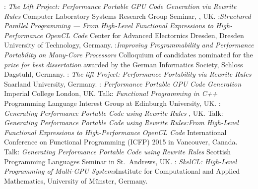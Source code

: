          {: \emph{The Lift Project: Performance Portable GPU Code Generation via Rewrite Rules}\newline
         Computer Laboratory Systems Research Group Seminar, , UK.
         }
         {:\newline \emph{Structured Parallel Programming --- From High-Level Functional Expressions to High-Performance OpenCL Code}\newline
         Center for Advanced Electornics Dresden, Dresden University of Technology, Germany.
         }
         {:\newline \emph{Improving Programmability and Performance Portability on Many-Core Processors}\newline
         \small Colloquium of candidates nominated for the \emph{prize for best dissertation} awarded by the German Informatics Society, Schloss Dagstuhl, Germany.}
         {: \emph{The lift Project: Performance Portability via Rewrite Rules}\newline
          \small Saarland University, Germany.}
         {: \emph{Performance Portable GPU Code Generation}\newline
         \small Imperial College London, UK.}
         {Talk: \emph{Functional Programming in C++}\newline
         \small Programming Language Interest Group at Edinburgh University, UK.}
         {: \emph{Generating Performance Portable Code using Rewrite Rules}\newline
         \small {}, UK.}
         {Talk: \emph{Generating Performance Portable Code using Rewrite Rules:\newline From High-Level Functional Expressions to High-Performance OpenCL Code}\newline
         \small International Conference on Functional Programming (ICFP) 2015 in Vancouver, Canada.}
         {Talk: \emph{Generating Performance Portable Code using Rewrite Rules}\newline
         \small Scottish Programming Languages Seminar in St.\ Andrews, UK.}
         {: \emph{SkelCL\@: High-Level Programming of Multi-GPU
          Systems}\newline \small Institute for Computational and Applied
          Mathematics, University of Münster, Germany.}
